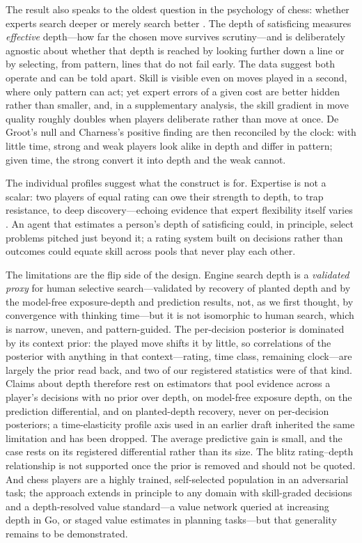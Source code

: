 The result also speaks to the oldest question in the psychology of chess: whether experts
search deeper or merely search better \citep{degroot1965,charness1981,gobet1998,connors2011}.
The depth of satisficing measures \emph{effective} depth---how far the chosen move survives
scrutiny---and is deliberately agnostic about whether that depth is reached by looking further
down a line or by selecting, from pattern, lines that do not fail early. The data suggest both
operate and can be told apart. Skill is visible even on moves played in a second, where only
pattern can act; yet expert errors of a given cost are better hidden rather than smaller, and,
in a supplementary analysis, the skill gradient in move quality roughly doubles when players
deliberate rather than move at once. De Groot's null and Charness's positive finding are then
reconciled by the clock: with little time, strong and weak players look alike in depth and
differ in pattern; given time, the strong convert it into depth and the weak cannot.

The individual profiles suggest what the construct is for. Expertise is not a scalar: two
players of equal rating can owe their strength to depth, to trap resistance, to deep
discovery---echoing evidence that expert
flexibility itself varies \citep{bilalic2008}. An agent that estimates a person's depth of
satisficing could, in principle, select problems pitched just beyond it; a rating system built
on decisions rather than outcomes could equate skill across pools that never play each other.

The limitations are the flip side of the design. Engine search depth is a \emph{validated
proxy} for human selective search---validated by recovery of planted depth and by the
model-free exposure-depth and prediction results, not, as we first thought, by convergence
with thinking time---but it is not isomorphic to human search, which is narrow, uneven, and
pattern-guided. The per-decision posterior is dominated by its context prior: the played move
shifts it by little, so correlations of the posterior with anything in that context---rating,
time class, remaining clock---are largely the prior read back, and two of our registered
statistics were of that kind. Claims about depth therefore rest on estimators that pool
evidence across a player's decisions with no prior over depth, on model-free exposure depth,
on the prediction differential, and on planted-depth recovery, never on per-decision
posteriors; a time-elasticity profile axis used in an earlier draft inherited the same
limitation and has been dropped. The average predictive gain is small, and the case rests on its registered
differential rather than its size. The blitz rating--depth relationship is not supported once
the prior is removed and should not be quoted. And chess players are a highly trained, self-selected population in an
adversarial task; the approach extends in principle to any domain with skill-graded decisions
and a depth-resolved value standard---a value network queried at increasing depth in Go, or
staged value estimates in planning tasks---but that generality remains to be demonstrated.

